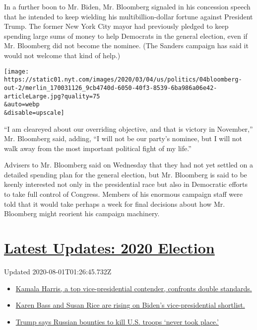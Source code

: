 In a further boon to Mr. Biden, Mr. Bloomberg signaled in his concession
speech that he intended to keep wielding his multibillion-dollar fortune
against President Trump. The former New York City mayor had previously
pledged to keep spending large sums of money to help Democrats in the
general election, even if Mr. Bloomberg did not become the nominee. (The
Sanders campaign has said it would not welcome that kind of help.)

\texttt{[image: https://static01.nyt.com/images/2020/03/04/us/politics/04bloomberg-out-2/merlin\_170031126\_9cb4740d-6050-40f3-8539-6ba986a06e42-articleLarge.jpg?quality=75\\\&auto=webp\\\&disable=upscale]}

``I am cleareyed about our overriding objective, and that is victory in
November,'' Mr. Bloomberg said, adding, ``I will not be our party's
nominee, but I will not walk away from the most important political
fight of my life.''

Advisers to Mr. Bloomberg said on Wednesday that they had not yet
settled on a detailed spending plan for the general election, but Mr.
Bloomberg is said to be keenly interested not only in the presidential
race but also in Democratic efforts to take full control of Congress.
Members of his enormous campaign staff were told that it would take
perhaps a week for final decisions about how Mr. Bloomberg might
reorient his campaign machinery.

\hypertarget{latest-updates-2020-election}{%
\section{\texorpdfstring{\href{https://www.nytimes.com/2020/07/31/us/elections/biden-vs-trump.html?action=click\&pgtype=Article\&state=default\&region=MAIN_CONTENT_1\&context=storylines_live_updates}{Latest
Updates: 2020
Election}}{Latest Updates: 2020 Election}}\label{latest-updates-2020-election}}

Updated 2020-08-01T01:26:45.732Z

\begin{itemize}
\tightlist
\item
  \href{https://www.nytimes.com/2020/07/31/us/elections/biden-vs-trump.html?action=click\&pgtype=Article\&state=default\&region=MAIN_CONTENT_1\&context=storylines_live_updates\#link-29fdff45}{Kamala
  Harris, a top vice-presidential contender, confronts double
  standards.}
\item
  \href{https://www.nytimes.com/2020/07/31/us/elections/biden-vs-trump.html?action=click\&pgtype=Article\&state=default\&region=MAIN_CONTENT_1\&context=storylines_live_updates\#link-13ec3d9c}{Karen
  Bass and Susan Rice are rising on Biden's vice-presidential
  shortlist.}
\item
  \href{https://www.nytimes.com/2020/07/31/us/elections/biden-vs-trump.html?action=click\&pgtype=Article\&state=default\&region=MAIN_CONTENT_1\&context=storylines_live_updates\#link-49e9a016}{Trump
  says Russian bounties to kill U.S. troops `never took place.'}
\end{itemize}

